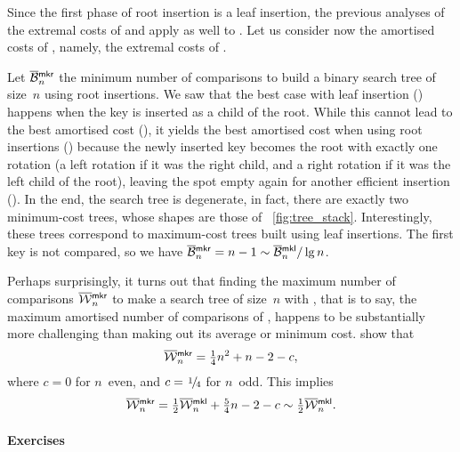 
Since the first phase of root insertion is a leaf insertion, the
previous analyses of the extremal costs of  and
 apply as well to . Let us consider now
the amortised costs of , namely, the extremal costs of
.

Let \(\OB{\fun{mkr}}{n}\) the minimum
number of comparisons to build a binary search tree of size~\(n\)
using root insertions. We saw that the best case with leaf insertion
() happens when the key is inserted as a child of the
root. While this cannot lead to the best amortised cost (),
it yields the best amortised cost when using root insertions
() because the newly inserted key becomes the root with
exactly one rotation (a left rotation if it was the right child, and a
right rotation if it was the left child of the root), leaving the spot
empty again for another efficient insertion (). In the
end, the search tree is degenerate, in fact, there are exactly two
minimum\hyp{}cost trees, whose shapes are those of
\fig~\vref{fig:tree_stack}. Interestingly, these trees correspond to
maximum\hyp{}cost trees built using leaf insertions. The first key is
not compared, so we have \(\OB{\fun{mkr}}{n} = n - 1 \sim
\OB{\fun{mkl}}{n}/\lg n\).

Perhaps surprisingly, it turns out that finding the maximum number of
comparisons \(\OW{\fun{mkr}}{n}\) 
to make a search tree of size~\(n\) with , that is to say,  
the maximum amortised number of comparisons of , happens
to be substantially more challenging than making out its average or
minimum cost. \cite{GeldenhuysVanderMerwe_2009} show that
\begin{equation*}
\OW{\fun{mkr}}{n} = \tfrac{1}{4}n^2 + n - 2 - c,
\end{equation*}
where \(c = 0\) for \(n\)~even, and \(c=\myfrac{1}/{4}\) for
\(n\)~odd. This implies
\begin{equation*}
\OW{\fun{mkr}}{n} = \tfrac{1}{2}\OW{\fun{mkl}}{n} + \tfrac{5}{4}n - 2 -
c \sim \tfrac{1}{2}\OW{\fun{mkl}}{n}.
\end{equation*}


\paragraph{Exercises}


